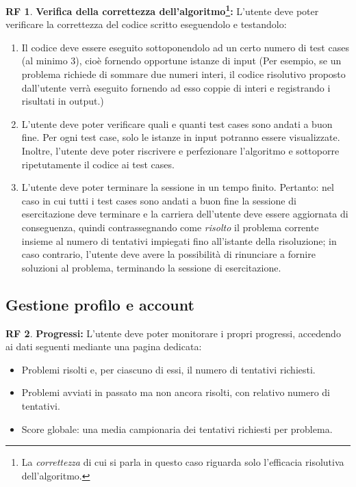 \documentclass[11pt, a4paper]{article}
\theoremstyle{definition}
\newtheorem{funcreq}{RF} %
\begin{document}
\begin{funcreq}
\textbf{Verifica della correttezza dell'algoritmo\footnote{La \textit{correttezza} di cui si parla in questo caso riguarda solo l'efficacia risolutiva dell'algoritmo.}:}
L'utente deve poter verificare la correttezza del codice scritto eseguendolo
e testandolo:
\begin{enumerate}
    \item Il codice deve essere eseguito sottoponendolo ad un certo numero
    di test cases (al minimo 3),
    cioè fornendo opportune istanze di input (Per esempio,
    se un problema richiede di sommare due numeri interi, il codice risolutivo
    proposto dall'utente verrà eseguito fornendo ad esso coppie di interi
    e registrando i risultati in output.)

    \item L'utente deve poter verificare quali e quanti test cases sono andati
    a buon fine. Per ogni test case, solo le istanze in input potranno
    essere visualizzate. Inoltre, l'utente deve poter riscrivere e
    perfezionare l'algoritmo e sottoporre ripetutamente il codice ai
    test cases.

    \item L'utente deve poter terminare la sessione in un tempo finito.
    Pertanto: nel caso in cui tutti i test cases sono andati a buon fine
    la sessione di esercitazione deve terminare e la carriera dell'utente
    deve essere aggiornata di conseguenza, quindi contrassegnando come
    \textit{risolto} il problema corrente insieme al numero di
    tentativi impiegati fino all'istante della risoluzione; in caso contrario,
    l'utente deve avere la possibilità di rinunciare a fornire soluzioni
    al problema, terminando la sessione di esercitazione.
\end{enumerate}
\end{funcreq}

\subsection{Gestione profilo e account}

\begin{funcreq}
\textbf{Progressi:}
L'utente deve poter monitorare i propri progressi, accedendo ai dati
seguenti mediante una pagina dedicata:
\begin{itemize}
    \item Problemi risolti e, per ciascuno di essi, il numero di tentativi richiesti.
    \item Problemi avviati in passato ma non ancora risolti, con relativo
    numero di tentativi.
    \item Score globale: una media campionaria dei tentativi richiesti
    per problema.
\end{itemize}
\end{funcreq}
\end{document}
